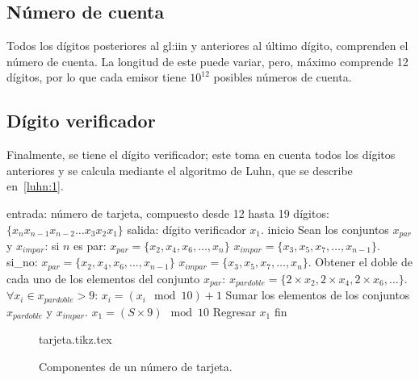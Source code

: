 \subsection{Número de cuenta}
Todos los dígitos posteriores al \gls{gl:iin} y anteriores al último dígito,
comprenden el número de cuenta. La longitud de este puede variar, pero, máximo
comprende 12 dígitos, por lo que cada emisor tiene $10^{12}$ posibles números
de cuenta.

\subsection{Dígito verificador}
\label{sec:algoritmo_luhn}

Finalmente, se tiene el dígito verificador; este toma en cuenta todos los
dígitos anteriores y se calcula mediante el algoritmo de Luhn, que se describe
en~\ref{luhn:1}.

\begin{pseudocodigo}[%
    caption={Algoritmo de Luhn.},
    label={luhn:1}%
  ]
    entrada: número de tarjeta, compuesto desde 12 hasta 19 dígitos:
             $\{x_{n} x_{n-1} x_{n-2} \dots x_3 x_2 x_1\}$
    salida:  dígito verificador $x_1$.
    inicio
      Sean los conjuntos $x_{par}$ y $x_{impar}$:
          si $n$ es par:
              $x_{par} = \{x_2, x_4, x_6, \dots, x_n\}$
              $x_{impar} = \{x_3, x_5, x_7, \dots, x_{n-1}\}$.
          si_no:
              $x_{par} = \{x_2, x_4, x_6, \dots, x_{n-1}\}$
              $x_{impar} = \{x_3, x_5, x_7, \dots, x_n\}$.
      Obtener el doble de cada uno de los elementos del conjunto $x_{par}$:
        $x_{par doble} = \{2 \times x_2, 2 \times x_4, 2 \times x_6, \dots \}$.
      $\forall x_i \in x_{par doble} > 9$:
          $x_i = (x_i \mod 10) + 1 $
      Sumar los elementos de los conjuntos $x_{par doble}$ y $x_{impar}$.
      $x_1 = (S \times 9) \mod 10$
      Regresar $x_1$
    fin
\end{pseudocodigo}

\begin{figure}
  \begin{center}
    {tarjeta.tikz.tex}
    \caption{Componentes de un número de tarjeta.}\label{figura:pan}
   \end{center}
\end{figure}
